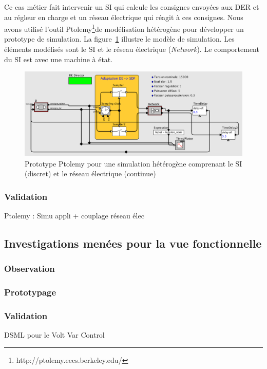 				Ce cas métier fait intervenir un SI qui calcule les consignes envoyées aux DER et au régleur en charge et un réseau électrique qui réagit à ces consignes. Nous avons utilisé l'outil Ptolemy\footnote{http://ptolemy.eecs.berkeley.edu/}de modélisation hétérogène pour développer un prototype de simulation. La figure~\ref{fig:simu_ptolemy} illustre le modèle de simulation. Les éléments modélisés sont le SI et le réseau électrique (\textit{Network}). Le comportement du SI est avec une machine à état.  
				
\begin{figure}[!ht]
 \begin{center}
  \includegraphics[trim = 0cm 5cm 0cm 0cm, width=1\textwidth]{figures/6_methodologie/simu_ptolemy.png}
 \end{center}
 \caption{Prototype Ptolemy pour une simulation hétérogène comprenant le SI (discret) et le réseau électrique (continue)}
 \label{fig:simu_ptolemy}
\end{figure}
		
				\subsubsection{Validation}
	Ptolemy : Simu appli + couplage réseau élec
			
	
		\subsection{Investigations menées pour la vue fonctionnelle} 
			\subsubsection{Observation}
		
			\subsubsection{Prototypage}
		
			\subsubsection{Validation}
	DSML pour le Volt Var Control
		
